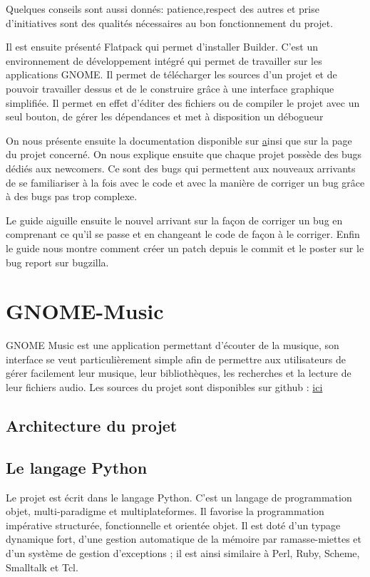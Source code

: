 \documentclass[12pt]{report}
\begin{document}
Quelques conseils sont aussi donnés: patience,respect des autres et prise
d'initiatives sont des qualités nécessaires au bon fonctionnement du projet.

Il est ensuite présenté Flatpack qui permet d'installer Builder.
C'est un environnement de développement intégré qui permet de travailler
sur les applications GNOME. Il permet de télécharger les sources d'un
projet et de pouvoir travailler dessus et de le construire grâce à une
interface graphique simplifiée. Il permet en effet d'éditer des fichiers
ou de compiler le projet avec un seul bouton, de gérer les dépendances
et met à disposition un débogueur

On nous présente ensuite la documentation disponible sur
\href{https://developper.gnome.org/search} ainsi que sur la page du
projet concerné. On nous explique ensuite que chaque projet possède
des bugs dédiés aux newcomers. Ce sont des bugs qui permettent aux
nouveaux arrivants de se familiariser à la fois avec le code et
avec la manière de corriger un bug grâce à des bugs pas trop
complexe.

Le guide aiguille ensuite le nouvel arrivant sur la façon de corriger
un bug en comprenant ce qu'il se passe et en changeant le code de
façon à le corriger. Enfin le guide nous montre comment créer un
patch depuis le commit et le poster sur le bug report sur bugzilla.


\newpage
\chapter{GNOME-Music}
GNOME Music est une application permettant d'écouter de la musique, 
son interface se veut particulièrement simple afin de permettre aux
utilisateurs de gérer facilement leur musique, leur bibliothèques, 
les recherches et la lecture de leur fichiers audio.
Les sources du projet sont disponibles sur github :
\href{https://github.com/GNOME/gnome-music}{ici}

\section{Architecture du projet}

\section{Le langage Python}
Le projet est écrit dans le langage Python. C'est un langage de
programmation objet, multi-paradigme et multiplateformes. Il favorise la
programmation impérative structurée, fonctionnelle et orientée objet. 
Il est doté d'un typage dynamique fort, d'une gestion automatique de la 
mémoire par ramasse-miettes et d'un système de gestion d'exceptions ; 
il est ainsi similaire à Perl, Ruby, Scheme, Smalltalk et Tcl.
\end{document}
